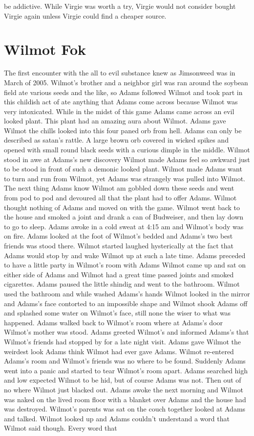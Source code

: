 \documentclass[12pt]{book}
\begin{document}
be addictive. While Virgie was worth a try, Virgie would not consider bought Virgie again unless Virgie could find a cheaper source.



\chapter{Wilmot Fok}

The first encounter with the all to evil substance knew as Jimsonweed was in March of 2005. Wilmot's brother and a neighbor girl was ran around the soybean field ate various seeds and the like, so Adams followed Wilmot and took part in this childish act of ate anything that Adams come across because Wilmot was very intoxicated. While in the midst of this game Adams came across an evil looked plant. This plant had an amazing aura about Wilmot. Adams gave Wilmot the chills looked into this four paned orb from hell. Adams can only be described as satan's rattle. A large brown orb covered in wicked spikes and opened with small round black seeds with a curious dimple in the middle. Wilmot stood in awe at Adams's new discovery Wilmot made Adams feel so awkward just to be stood in front of such a demonic looked plant. Wilmot made Adams want to turn and run from Wilmot, yet Adams was strangely was pulled into Wilmot. The next thing Adams know Wilmot am gobbled down these seeds and went from pod to pod and devoured all that the plant had to offer Adams. Wilmot thought nothing of Adams and moved on with the game. Wilmot went back to the house and smoked a joint and drank a can of Budweiser, and then lay down to go to sleep. Adams awoke in a cold sweat at 4:15 am and Wilmot's body was on fire. Adams looked at the foot of Wilmot's bedded and Adams's two best friends was stood there. Wilmot started laughed hysterically at the fact that Adams would stop by and wake Wilmot up at such a late time. Adams preceded to have a little party in Wilmot's room with Adams Wilmot came up and sat on either side of Adams and Wilmot had a great time passed joints and smoked cigarettes. Adams paused the little shindig and went to the bathroom. Wilmot used the bathroom and while washed Adams's hands Wilmot looked in the mirror and Adams's face contorted to an impossible shape and Wilmot shook Adams off and splashed some water on Wilmot's face, still none the wiser to what was happened. Adams walked back to Wilmot's room where at Adams's door Wilmot's mother was stood. Adams greeted Wilmot's and informed Adams's that Wilmot's friends had stopped by for a late night visit. Adams gave Wilmot the weirdest look Adams think Wilmot had ever gave Adams. Wilmot re-entered Adams's room and Wilmot's friends was no where to be found. Suddenly Adams went into a panic and started to tear Wilmot's room apart. Adams searched high and low expected Wilmot to be hid, but of course Adams was not. Then out of no where Wilmot just blacked out. Adams awoke the next morning and Wilmot was naked on the lived room floor with a blanket over Adams and the house had was destroyed. Wilmot's parents was sat on the couch together looked at Adams and talked. Wilmot looked up and Adams couldn't understand a word that Wilmot said though. Every word that 
\end{document}
